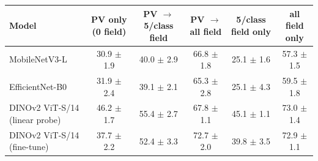 \begin{tabular}{lccccc}\toprule
Model & PV only (0 field) & PV $\rightarrow$ 5/class field & PV $\rightarrow$ all field & 5/class field only & all field only \\\midrule
MobileNetV3-L & 30.9 $\pm$ 1.9 & 40.0 $\pm$ 2.9 & 66.8 $\pm$ 1.8 & 25.1 $\pm$ 1.6 & 57.3 $\pm$ 1.5 \\
EfficientNet-B0 & 31.9 $\pm$ 2.4 & 39.1 $\pm$ 2.1 & 65.3 $\pm$ 2.8 & 25.1 $\pm$ 4.3 & 59.5 $\pm$ 1.8 \\
DINOv2 ViT-S/14 (linear probe) & 46.2 $\pm$ 1.7 & 55.4 $\pm$ 2.7 & 67.8 $\pm$ 1.1 & 45.1 $\pm$ 1.1 & 73.0 $\pm$ 1.4 \\
DINOv2 ViT-S/14 (fine-tune) & 37.7 $\pm$ 2.2 & 52.4 $\pm$ 3.3 & 72.7 $\pm$ 2.0 & 39.8 $\pm$ 3.5 & 72.9 $\pm$ 1.1 \\
\bottomrule\end{tabular}
